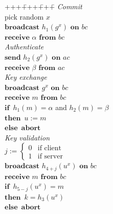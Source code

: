 \documentclass[runningheads,envcountsame,envcountsect,oribibl]{llncs}
\newcommand{\assign}{\mathrel{:=}}	\newcommand{\keyw}[1]{\ensuremath{\mathbf{#1}}} \newcommand{\xor}{\oplus}		\newcommand{\Z}{\mathbb{Z}}		\newcommand{\card}[1]{\lvert{#1}\rvert}
\newcommand{\IF}{\keyw{if}~}
\newcommand{\THEN}{\keyw{then}~}
\newcommand{\ELSE}{\keyw{else}~}
\newcommand{\eke}{$\varphi$KE}
\newcommand{\modp}[1]{#1}
\newlength{\protindent}
\begin{document}
\begin{protocol}[t]
\hspace{\protindent}
\begin{minipage}{\textwidth}
\begin{tabbing}
+++\=+++\=+++\=\kill
\textit{Commit} \\

\> pick random $x$ \\
\> \keyw{broadcast} $h_1(\modp{g^x})$ \keyw{on} $bc$ \\
\> \keyw{receive} $\alpha$ \keyw{from} $bc$ \\

\textit{Authenticate} \\

\> \keyw{send} $h_2(\modp{g^x})$ \keyw{on} $ac$ \\
\> \keyw{receive} $\beta$ \keyw{from} $ac$ \\

\textit{Key exchange} \\

\> \keyw{broadcast} $\modp{g^x}$ \keyw{on} $bc$ \\
\> \keyw{receive} $m$ \keyw{from} $bc$ \\
\> \IF $h_1(m) = \alpha$ and $h_2(m) = \beta$ \\
\> \> \THEN $u \assign m$\\
\> \> \ELSE \keyw{abort} \\

\textit{Key validation} \\

\> $j \assign \begin{cases}
        0 & \text{if client} \\
        1 & \text{if server}
        \end{cases}$ \\
\> \keyw{broadcast} $h_{4+j}(\modp{u^x})$ \keyw{on} $bc$ \\
\> \keyw{receive} $m$ \keyw{from} $bc$ \\
\> \IF $h_{5-j}(\modp{u^x}) = m$ \\
\> \> \THEN $k = h_3(\modp{u^x})$ \\
\> \> \ELSE \keyw{abort} \\
\end{tabbing}
\end{minipage}
\caption{\eke{} for bidirectional authentic channel.}
\label{prot-biauth}
\end{protocol}
\end{document}
